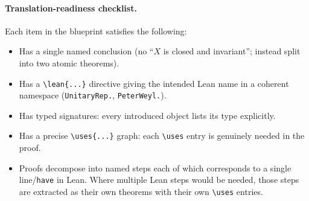 \paragraph{Translation-readiness checklist.}
Each item in the blueprint satisfies the following:
\begin{itemize}
  \item Has a single named conclusion (no ``$X$ is closed and invariant'';
    instead split into two atomic theorems).
  \item Has a \texttt{\textbackslash lean\{...\}} directive giving the
    intended Lean name in a coherent namespace
    (\texttt{UnitaryRep.}, \texttt{PeterWeyl.}).
  \item Has typed signatures: every introduced object lists its type
    explicitly.
  \item Has a precise \texttt{\textbackslash uses\{...\}} graph: each
    \texttt{\textbackslash uses} entry is genuinely needed in the
    proof.
  \item Proofs decompose into named steps each of which corresponds to
    a single line/\texttt{have} in Lean. Where multiple Lean steps would
    be needed, those steps are extracted as their own theorems with
    their own \texttt{\textbackslash uses} entries.
\end{itemize}
